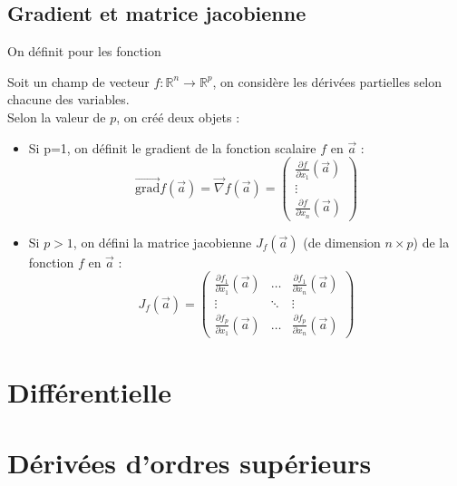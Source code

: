 \subsection{Gradient et matrice jacobienne}
On définit pour les fonction
\begin{defi}
Soit un champ de vecteur $f:\mathbb{R}^n\to\mathbb{R}^p$, on considère les dérivées partielles selon chacune des variables.\\
Selon la valeur de $p$, on créé deux objets :
\begin{itemize}
    \item Si  p=1, on définit le gradient de la fonction scalaire $f$ en $\overrightarrow{a}$ : $$\overrightarrow{\text{grad}}f(\overrightarrow{a})=\overrightarrow{\nabla} f(\overrightarrow{a})=\begin{pmatrix}\frac{\partial f}{\partial x_1}(\overrightarrow{a})\\\vdots\\\frac{\partial f}{\partial x_n}(\overrightarrow{a})\end{pmatrix}$$
    \item Si $p>1$, on défini la matrice jacobienne $J_f(\overrightarrow{a})$ (de dimension $n\times p$) de la fonction $f$ en $\overrightarrow{a}$ : $$J_f(\overrightarrow{a})=\begin{pmatrix}\frac{\partial f_1}{\partial x_1}(\overrightarrow{a})&\hdots&\frac{\partial f_1}{\partial x_n}(\overrightarrow{a})\\ \vdots & \ddots & \vdots\\ \frac{\partial f_p}{\partial x_1}(\overrightarrow{a}) & \hdots & \frac{\partial f_p}{\partial x_n}(\overrightarrow{a})\end{pmatrix}$$
\end{itemize}
\end{defi}
\section{Différentielle}
\section{Dérivées d'ordres supérieurs}